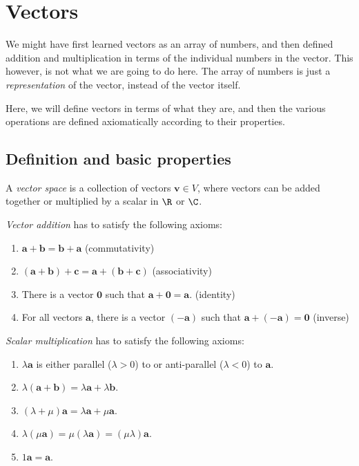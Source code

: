 \documentclass[a4paper]{article}
\begin{document}
\section{Vectors}
We might have first learned vectors as an array of numbers, and then defined addition and multiplication in terms of the individual numbers in the vector. This however, is not what we are going to do here. The array of numbers is just a \emph{representation} of the vector, instead of the vector itself.

Here, we will define vectors in terms of what they are, and then the various operations are defined axiomatically according to their properties.
\subsection{Definition and basic properties}
\begin{defi}[Vector]
  A \emph{vector space} is a collection of vectors $\mathbf{v}\in V$, where vectors can be added together or multiplied by a scalar in $\R$ or $\C$.

  \emph{Vector addition} has to satisfy the following axioms:
  \begin{enumerate}
    \item $\mathbf{a} + \mathbf{b} = \mathbf{b} + \mathbf{a}$ \hfill (commutativity)
    \item $(\mathbf{a} + \mathbf{b}) + \mathbf{c} = \mathbf{a} + (\mathbf{b} + \mathbf{c})$ \hfill (associativity)
    \item There is a vector $\mathbf{0}$ such that $\mathbf{a} + \mathbf{0} = \mathbf{a}$. \hfill (identity)
    \item For all vectors $\mathbf{a}$, there is a vector $(-\mathbf{a})$ such that $\mathbf{a} + (-\mathbf{a}) = \mathbf{0}$ \hfill (inverse)
  \end{enumerate}
  \emph{Scalar multiplication} has to satisfy the following axioms:
  \begin{enumerate}
    \item $\lambda\mathbf{a}$ is either parallel ($\lambda > 0$) to or anti-parallel ($\lambda < 0$) to $\mathbf{a}$.
    \item $\lambda(\mathbf{a + b}) = \lambda\mathbf{a} + \lambda\mathbf{b}$.
    \item $(\lambda + \mu)\mathbf{a} = \lambda\mathbf{a} + \mu\mathbf{a}$.
    \item $\lambda(\mu\mathbf{a}) = \mu(\lambda\mathbf{a}) = (\mu\lambda)\mathbf{a}$.
    \item $1\mathbf{a = a}$.
  \end{enumerate}
\end{defi}
\end{document}
